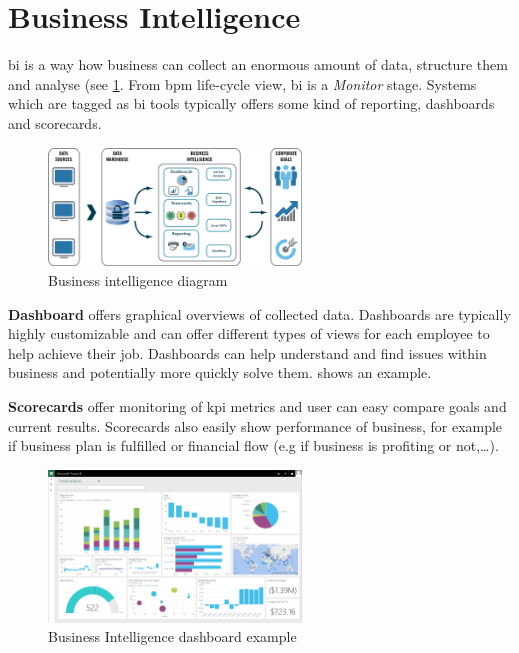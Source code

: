 \section{Business Intelligence}

\gls{bi} is a way how business can collect an enormous amount of data, structure them and analyse (see \cref{fig:bi-diagram}. From \gls{bpm} life-cycle view, \gls{bi} is a \textit{Monitor} stage. Systems which are tagged as \gls{bi} tools typically offers some kind of reporting, dashboards and scorecards. 

\begin{figure}[ht!]
	\centering
    \includegraphics[width=0.6\textwidth]{img/mortgage-business-intelligence-diagram.png}
    \caption{Business intelligence diagram \cite{business-intelligence-diagram-2018}}
    \label{fig:bi-diagram}
\end{figure}

\textbf{Dashboard} offers graphical overviews of collected data. Dashboards are typically highly customizable and can offer different types of views for each employee to help achieve their job. Dashboards can help understand and find issues within business and potentially more quickly solve them.  shows an example. 

\textbf{Scorecards} offer monitoring of \gls{kpi} metrics and user can easy compare goals and current results. Scorecards also easily show performance of business, for example if business plan is fulfilled or financial flow (e.g if business is profiting or not,\dots). 

\begin{figure}[ht!]
	\centering
    \includegraphics[width=0.6\textwidth]{img/microsoft-power-bi-dashboard.png}
    \caption{Business Intelligence dashboard example~\cite{ms-business-intelligence-2018}}
    \label{fig:bi-dashboard}
\end{figure}
